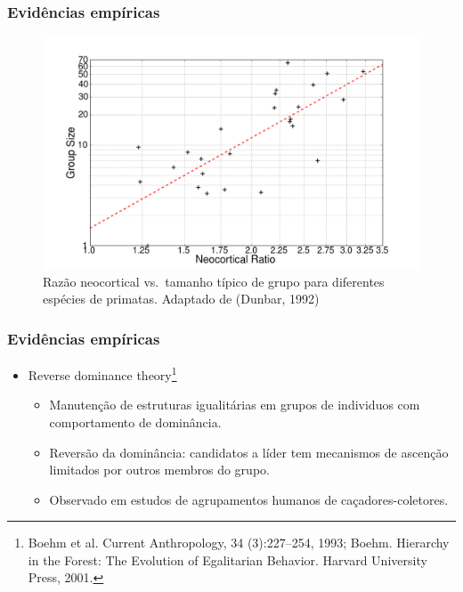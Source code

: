 \documentclass[ignorenonframetext,]{beamer}
\makeatletter
\def\ScaleIfNeededV{%
  \ifdim\Gin@nat@width>0.9\linewidth
    0.9\linewidth
  \else
    \Gin@nat@width
  \fi
}
\def\ScaleIfNeededH{%
  \ifdim\Gin@nat@height>0.9\textheight
    0.9\textheight
  \else
    \Gin@nat@height
  \fi
}
\let\Oldincludegraphics\includegraphics
\renewcommand{\includegraphics}[2][]{\Oldincludegraphics[width=\ScaleIfNeededV,height=\ScaleIfNeededH,keepaspectratio]{#2}}
\makeatother
\begin{document}
\begin{frame}\frametitle{Evidências empíricas}

\begin{figure}[htbp]
\centering
\includegraphics{./figs/dunbar.png}
\caption{Razão neocortical vs.~tamanho típico de grupo para diferentes
espécies de primatas. Adaptado de (Dunbar, 1992)}
\end{figure}

\end{frame}

\begin{frame}\frametitle{Evidências empíricas}

\begin{itemize}
\itemsep1pt\parskip0pt
\item
  Reverse dominance
  theory\footnote{Boehm et al. Current Anthropology, 34 (3):227–254, 1993; Boehm. Hierarchy in the Forest: The Evolution of Egalitarian Behavior. Harvard University Press, 2001.}

  \begin{itemize}
  \itemsep1pt\parskip0pt
  \item
    Manutenção de estruturas igualitárias em grupos de individuos com
    comportamento de dominância.
  \item
    Reversão da dominância: candidatos a líder tem mecanismos de
    ascenção limitados por outros membros do grupo.
  \item
    Observado em estudos de agrupamentos humanos de caçadores-coletores.
  \end{itemize}
\end{itemize}

\end{frame}
\end{document}
